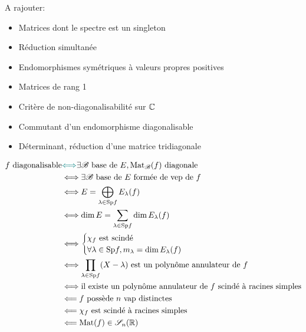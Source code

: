 A rajouter:
\begin{itemize}
    \item Matrices dont le spectre est un singleton
    \item Réduction simultanée
    \item Endomorphismes symétriques à valeurs propres positives
    \item Matrices de rang 1
    \item Critère de non-diagonalisabilité sur $\mathbb{C}$
    \item Commutant d'un endomorphisme diagonalisable 
    \item Déterminant, réduction d'une matrice tridiagonale 
\end{itemize}

\newpage

\def\colequi{teal}
\def\colimpli{orange}

\begin{Large}
\begin{align*}
    f \text{ diagonalisable} &\textcolor{\colequi}{\Longleftrightarrow} \exists \mathscr{B} \text{ base de } E, \Mat_\mathscr{B}(f) \text{ diagonale} \\
    &\Longleftrightarrow \exists \mathscr{B} \text{ base de } E \text{ formée de vep de } f\\
    &\Longleftrightarrow E = \bigoplus_{\lambda \in \Sp f} E_\lambda(f) \\
    &\Longleftrightarrow \dim E = \sum_{\lambda \in \Sp f} \dim E_\lambda(f) \\
    &\Longleftrightarrow 
    \begin{cases}
    \chi_f \text{ est scindé} \\
    \forall \lambda \in \Sp f, m_{\lambda} = \dim E_\lambda(f)
    \end{cases} \\
    &\Longleftrightarrow \prod_{\lambda \in \Sp f}(X-\lambda) \text{ est un polynôme annulateur de } f\\
    &\Longleftrightarrow \text{il existe un polynôme annulateur de } f \text{ scindé à racines simples} \\
    &\Longleftarrow f \text{ possède } n \text{ vap distinctes} \\
    &\Longleftarrow \chi_f \text{ est scindé à racines simples} \\
    &\Longleftarrow \Mat(f) \in \mathscr{S}_n(\R)
\end{align*}
\end{Large}
